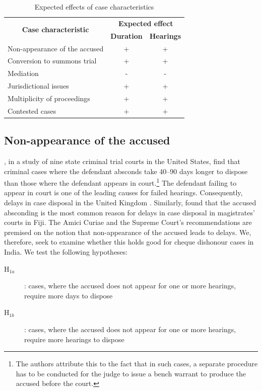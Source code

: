 \documentclass[12pt,a4paper]{article}
\begin{document}
\begin{longtable}{@{}lcc@{}}
\caption{Expected effects of case characteristics}
\label{tab:expected}\\
\toprule
\multicolumn{1}{c}{\multirow{2}{*}{\textbf{Case characteristic}}} & \multicolumn{2}{c}{\textbf{Expected effect}} \\ \cmidrule(l){2-3} 
\multicolumn{1}{c}{} & \textbf{Duration} & \textbf{Hearings} \\ \midrule
Non-appearance of the accused & + & + \\
Conversion to summons trial & + & + \\
Mediation & - & - \\
Jurisdictional issues & + & + \\
Multiplicity of proceedings & + & + \\
Contested cases & + & + \\ \bottomrule
\end{longtable}

\subsection{Non-appearance of the accused} 
\label{sec:non-appe-accus}

\textcite{ostrom2000efficiency}, in a study of nine state criminal trial courts in the United States, find that criminal cases where the defendant absconds take 40--90 days longer to dispose than those where the defendant appears in court.\footnote{The authors attribute this to the fact that in such cases, a separate procedure has to be conducted for the judge to issue a bench warrant to produce the accused before the court.} The defendant failing to appear in court is one of the leading causes for failed hearings. Consequently, delays in case disposal in the United Kingdom \autocite{crownProsecutionService2006_magistrateCourtEfficiency}. Similarly, \textcite{llangasinghe1988_fijiJudicialDelays} found that the accused absconding is the most common reason for delays in case disposal in magistrates' courts in Fiji. The Amici Curiae and the Supreme Court's recommendations are premised on the notion that non-appearance of the accused leads to delays. We, therefore, seek to examine whether this holds good for cheque dishonour cases in India. We test the following hypotheses:

\begin{description}
\item[H$_{1a}$]: cases, where the accused does not appear for one or more hearings, require more days to dispose
\item[H$_{1b}$]: cases, where the accused does not appear for one or more hearings, require more hearings to dispose
\end{description}
\end{document}
